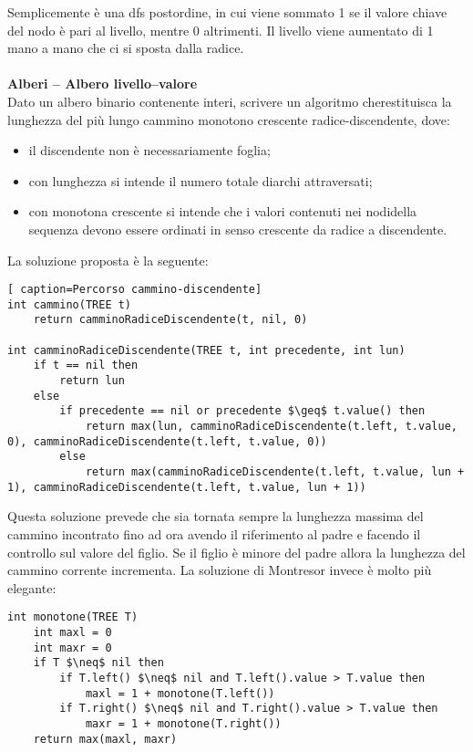 \documentclass[../cheatSheetAlgoritmi.tex]{subfiles}
\begin{document}
Semplicemente è una dfs postordine, in cui viene sommato 1 se il valore chiave del nodo è pari al livello, mentre 0 altrimenti. Il livello viene aumentato di 1 mano a mano che ci si sposta dalla radice. \\\\
\textbf{Alberi – Albero livello–valore}\\
Dato un albero binario contenente interi, scrivere un algoritmo cherestituisca la lunghezza del più lungo cammino monotono crescente radice-discendente, dove:
\begin{itemize}
	\item il discendente non è necessariamente foglia;
	\item con lunghezza si intende il numero totale diarchi attraversati;
	\item con monotona crescente si intende che i valori contenuti nei nodidella sequenza devono essere ordinati in senso crescente da radice a discendente.
\end{itemize}

La soluzione proposta è la seguente:
\begin{lstlisting}[ caption=Percorso cammino-discendente]
int cammino(TREE t)
	return camminoRadiceDiscendente(t, nil, 0)

int camminoRadiceDiscendente(TREE t, int precedente, int lun)
  	if t == nil then
   		return lun
  	else
    	if precedente == nil or precedente $\geq$ t.value() then
      		return max(lun, camminoRadiceDiscendente(t.left, t.value, 0), camminoRadiceDiscendente(t.left, t.value, 0))
    	else
      		return max(camminoRadiceDiscendente(t.left, t.value, lun + 1), camminoRadiceDiscendente(t.left, t.value, lun + 1))
\end{lstlisting}

Questa soluzione prevede che sia tornata sempre la lunghezza massima del cammino incontrato fino ad ora avendo il riferimento al padre e facendo il controllo sul valore del figlio. Se il figlio è minore del padre allora la lunghezza del cammino corrente incrementa.
La soluzione di Montresor invece è molto più elegante:
\begin{lstlisting}[caption=Percorso cammino-discendente Montresor]
int monotone(TREE T)
	int maxl = 0
	int maxr = 0
	if T $\neq$ nil then
		if T.left() $\neq$ nil and T.left().value > T.value then
			maxl = 1 + monotone(T.left())
		if T.right() $\neq$ nil and T.right().value > T.value then
			maxr = 1 + monotone(T.right())
	return max(maxl, maxr)
\end{lstlisting}

\newpage
\end{document}
